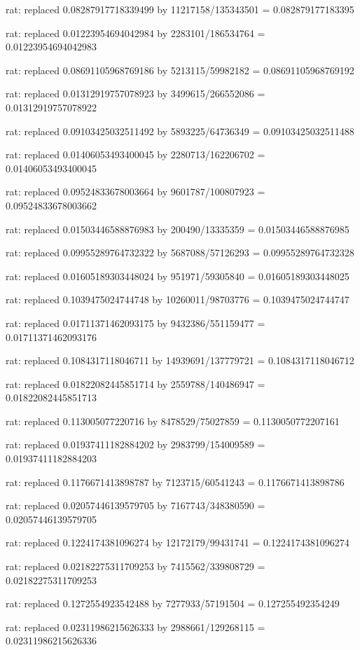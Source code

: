 \documentclass[a4paper,10pt]{article}
\begin{document}
\begin{eulernotebook}
\begin{eulercomment}
\begin{eulercomment}
\begin{eulercomment}
\begin{eulercomment}
\begin{eulercomment}
\begin{eulercomment}
\begin{eulercomment}
\begin{eulercomment}
\begin{eulercomment}
\begin{eulercomment}
\begin{eulercomment}
\begin{eulercomment}
\begin{eulercomment}
\begin{eulercomment}
\begin{eulercomment}
\begin{eulercomment}
\begin{euleroutput}
  rat: replaced 0.08287917718339499 by 11217158/135343501 = 0.082879177183395
  
  rat: replaced 0.01223954694042984 by 2283101/186534764 = 0.01223954694042983
  
  rat: replaced 0.08691105968769186 by 5213115/59982182 = 0.08691105968769192
  
  rat: replaced 0.01312919757078923 by 3499615/266552086 = 0.01312919757078922
  
  rat: replaced 0.09103425032511492 by 5893225/64736349 = 0.09103425032511488
  
  rat: replaced 0.01406053493400045 by 2280713/162206702 = 0.01406053493400045
  
  rat: replaced 0.09524833678003664 by 9601787/100807923 = 0.09524833678003662
  
  rat: replaced 0.01503446588876983 by 200490/13335359 = 0.01503446588876985
  
  rat: replaced 0.09955289764732322 by 5687088/57126293 = 0.09955289764732328
  
  rat: replaced 0.01605189303448024 by 951971/59305840 = 0.01605189303448025
  
  rat: replaced 0.1039475024744748 by 10260011/98703776 = 0.1039475024744747
  
  rat: replaced 0.01711371462093175 by 9432386/551159477 = 0.01711371462093176
  
  rat: replaced 0.1084317118046711 by 14939691/137779721 = 0.1084317118046712
  
  rat: replaced 0.01822082445851714 by 2559788/140486947 = 0.01822082445851713
  
  rat: replaced 0.113005077220716 by 8478529/75027859 = 0.1130050772207161
  
  rat: replaced 0.01937411182884202 by 2983799/154009589 = 0.01937411182884203
  
  rat: replaced 0.1176671413898787 by 7123715/60541243 = 0.1176671413898786
  
  rat: replaced 0.02057446139579705 by 7167743/348380590 = 0.02057446139579705
  
  rat: replaced 0.1224174381096274 by 12172179/99431741 = 0.1224174381096274
  
  rat: replaced 0.02182275311709253 by 7415562/339808729 = 0.02182275311709253
  
  rat: replaced 0.1272554923542488 by 7277933/57191504 = 0.127255492354249
  
  rat: replaced 0.02311986215626333 by 2988661/129268115 = 0.02311986215626336
  

\end{euleroutput}
\end{eulercomment}
\end{eulercomment}
\end{eulercomment}
\end{eulercomment}
\end{eulercomment}
\end{eulercomment}
\end{eulercomment}
\end{eulercomment}
\end{eulercomment}
\end{eulercomment}
\end{eulercomment}
\end{eulercomment}
\end{eulercomment}
\end{eulercomment}
\end{eulercomment}
\end{eulercomment}
\end{eulernotebook}
\end{document}
